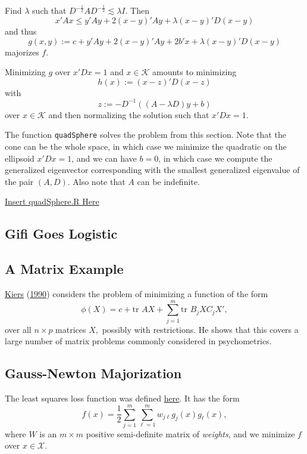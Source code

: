 \documentclass[
  12pt,
]{book}
\begin{document}
Find \(\lambda\) such that \(D^{-\frac12}AD^{-\frac12}\lesssim \lambda I.\) Then
\[
x'Ax\leq y'Ay+2(x-y)'Ay+\lambda(x-y)'D(x-y)
\]
and thus
\[
g(x,y):=c+y'Ay+2(x-y)'Ay+2b'x+\lambda(x-y)'D(x-y)
\]
majorizes \(f\).

Minimizing \(g\) over \(x'Dx=1\)
and \(x\in\mathcal{K}\) amounts to minimizing
\[
h(x):=(x-z)'D(x-z)
\]
with
\[
z:=-D^{-1}((A-\lambda D)y+b)
\]
over \(x\in\mathcal{K}\) and then normalizing the solution such that \(x'Dx=1\).

The function \texttt{quadSphere} solves the problem from this section. Note that the cone can be the whole space, in which case we minimize the quadratic on the ellipsoid \(x'Dx=1\), and we can have \(b=0\), in which case we compute the generalized eigenvector corresponding with the smallest generalized eigenvalue of the pair \((A,D)\). Also note that \(A\) can be indefinite.

\href{../code/quadSphere.R}{Insert quadSphere.R Here}

\hypertarget{gifi-goes-logistic}{%
\subsection{Gifi Goes Logistic}\label{gifi-goes-logistic}}

\hypertarget{a-matrix-example}{%
\subsection{A Matrix Example}\label{a-matrix-example}}

\protect\hyperlink{ref-kiers_90}{Kiers} (\protect\hyperlink{ref-kiers_90}{1990}) considers the problem of minimizing a function
of the form
\[
\phi(X)=c+\text{tr }AX + \sum_{j=1}^m\text{tr }B_jXC_jX',
\]
over all \(n\times p\) matrices \(X,\) possibly with restrictions.
He shows that this covers a large number of matrix problems
commonly considered in psychometrics.

\hypertarget{gauss-newton-majorization}{%
\subsection{Gauss-Newton Majorization}\label{gauss-newton-majorization}}

The least squares loss function was defined \href{../alternatingleastsquares/introduction.html}{here}.
It has the form
\[
f(x)=\frac12\sum_{j=1}^m\sum_{\ell=1}^m w_{j\ell}g_j(x)g_\ell(x),
\]
where \(W\) is an \(m\times m\) positive semi-definite matrix of \emph{weights}, and we minimize \(f\) over \(x\in\mathcal{X}\).
\end{document}
